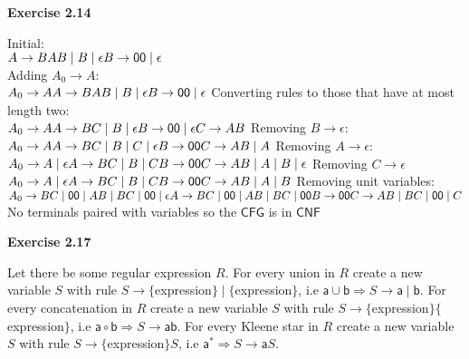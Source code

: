 \documentclass{article}
\makeatletter
\newcommand\exercise[1]{\par\vspace{4ex}\normalfont\normalsize\noindent
\textbf{\large Exercise #1}\par\nobreak\@afterindentfalse\@afterheading}
\makeatother
\begin{document}
\exercise{2.14}
Initial: \\
$A \rightarrow BAB \mid B \mid \epsilon \\ 
B \rightarrow \textsf{00} \mid \epsilon$\\
Adding $A_0 \rightarrow A$:\\
$A_0 \rightarrow A \\
A \rightarrow BAB \mid B \mid \epsilon \\
B \rightarrow \textsf{00} \mid \epsilon \\$
Converting rules to those that have at most length two: \\
$A_0 \rightarrow A \\
A \rightarrow BC \mid B \mid \epsilon \\
B \rightarrow \textsf{00} \mid \epsilon \\
C \rightarrow AB \\$
Removing $B \rightarrow \epsilon$:\\
$A_0 \rightarrow A \\ 
A \rightarrow BC \mid B \mid C \mid \epsilon \\
B \rightarrow \textsf{00} \\
C \rightarrow AB \mid A \\$
Removing $A \rightarrow \epsilon$:\\
$A_0 \rightarrow A \mid \epsilon \\
A \rightarrow BC \mid B \mid C \\
B \rightarrow \textsf{00} \\
C \rightarrow AB \mid A \mid B \mid \epsilon\\$
Removing $C \rightarrow \epsilon$\\
$A_0 \rightarrow A \mid \epsilon \\
A \rightarrow BC \mid B \mid C \\
B \rightarrow \textsf{00} \\
C \rightarrow AB \mid A \mid B\\$
Removing unit variables:\\
$A_0 \rightarrow BC \mid \textsf{00} \mid AB \mid BC \mid \textsf{00} \mid \epsilon \\
A \rightarrow BC \mid \textsf{00} \mid AB \mid BC \mid \textsf{00} \\
B \rightarrow \textsf{00} \\
C \rightarrow AB \mid BC \mid \textsf{00} \mid C \\$
No terminals paired with variables so the $\textsf{CFG}$ is in $\textsf{CNF}$

\exercise{2.17}
Let there be some regular expression $R$. For every union in $R$ create a new variable $S$ with rule $S \rightarrow \{$expression$\} \mid \{$expression$\}$, i.e $\textsf{a} \cup \textsf{b} \Rightarrow S \rightarrow \textsf{a} \mid \textsf{b}$. For every concatenation in $R$ create a new variable $S$ with rule $S \rightarrow \{$expression$\}\{$expression$\}$, i.e $\textsf{a} \circ \textsf{b} \Rightarrow S \rightarrow \textsf{a}\textsf{b}$. For every Kleene star in $R$ create a new variable $S$ with rule $S \rightarrow \{$expression$\}S$, i.e $\textsf{a}^{\ast} \Rightarrow S \rightarrow \textsf{a}S$.
\end{document}
